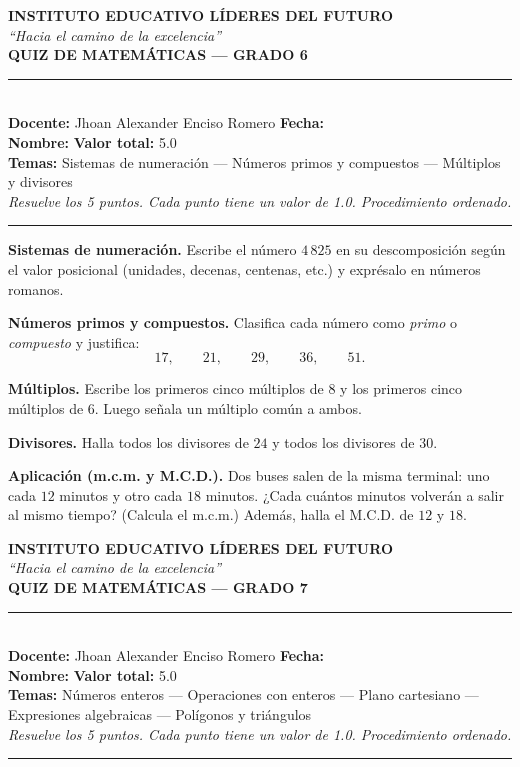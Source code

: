 \documentclass[11pt]{article}
\newcommand{\linea}[1]{\underline{\hspace{#1}}}
\newcommand{\encabezadoquiz}[2]{%
  \begin{center}
    {\large\bfseries INSTITUTO EDUCATIVO LÍDERES DEL FUTURO}\\[2pt]
    {\itshape\small ``Hacia el camino de la excelencia''}\\[5pt]
    {\Large\bfseries QUIZ DE MATEMÁTICAS --- GRADO #1}
  \end{center}
  \vspace{2pt}
  \noindent\rule{\textwidth}{0.8pt}\\[6pt]
  \noindent\textbf{Docente:} Jhoan Alexander Enciso Romero \hfill \textbf{Fecha:} \linea{3.2cm}\\[8pt]
  \noindent\textbf{Nombre:} \linea{9cm} \hfill \textbf{Valor total:} 5.0\\[6pt]
  \noindent\textbf{Temas:} #2\\[2pt]
  \noindent\textit{\small Resuelve los 5 puntos. Cada punto tiene un valor de 1.0. Procedimiento ordenado.}
  \par\vspace{4pt}\noindent\rule{\textwidth}{0.4pt}\par\vspace{8pt}
}
\begin{document}
\encabezadoquiz{6\textdegree}{Sistemas de numeración --- Números primos y compuestos --- Múltiplos y divisores}

\begin{puntos}
  \item \textbf{Sistemas de numeración.} Escribe el número $4\,825$ en su descomposición según el valor posicional
        (unidades, decenas, centenas, etc.) y exprésalo en números romanos.

  \item \textbf{Números primos y compuestos.} Clasifica cada número como \emph{primo} o \emph{compuesto} y justifica:
        \[ 17, \qquad 21, \qquad 29, \qquad 36, \qquad 51. \]

  \item \textbf{Múltiplos.} Escribe los primeros cinco múltiplos de $8$ y los primeros cinco múltiplos de $6$.
        Luego señala un múltiplo común a ambos.

  \item \textbf{Divisores.} Halla todos los divisores de $24$ y todos los divisores de $30$.

  \item \textbf{Aplicación (m.c.m. y M.C.D.).} Dos buses salen de la misma terminal: uno cada $12$ minutos y otro
        cada $18$ minutos. ¿Cada cuántos minutos volverán a salir al mismo tiempo? (Calcula el m.c.m.)
        Además, halla el M.C.D. de $12$ y $18$.
\end{puntos}

\newpage

\encabezadoquiz{7\textdegree}{Números enteros --- Operaciones con enteros --- Plano cartesiano --- Expresiones algebraicas --- Polígonos y triángulos}
\end{document}

